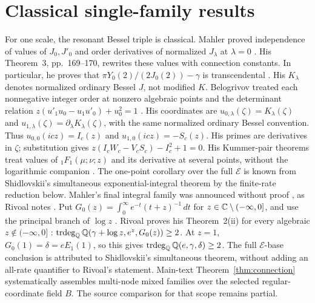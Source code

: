 \section{Classical single-family results}\label{sup:classical-comparison}
For one scale, the resonant Bessel triple is classical. Mahler proved
independence of values of $J_0,J'_0$ and order derivatives of normalized
$J_\lambda$ at $\lambda=0$ \cite[Theorem~2, p.~167]{Mahler1968}. His
Theorem~3, pp.~169--170, rewrites these values with connection constants.
In particular, he proves that $\pi Y_0(2)/(2J_0(2))-\gamma$ is
transcendental \cite[Theorem~3 and its consequence, pp.~169--170]{Mahler1968}.
His $K_\lambda$ denotes normalized ordinary Bessel $J$, not modified $K$.
Belogrivov treated each
nonnegative integer order at nonzero algebraic points and the determinant
relation $z(u'_1u_0-u_1u'_0)+u_0^2=1$
\cite[Theorem~4, Lemmas~4--5, (36)]{Belogrivov1973}.
His coordinates are $u_{0,\lambda}(\zeta)=K_\lambda(\zeta)$ and
$u_{1,\lambda}(\zeta)=\partial_\lambda K_\lambda(\zeta)$, with the
same normalized ordinary Bessel convention. Thus
$u_{0,0}(icz)=I_c(z)$ and $u_{1,0}(icz)=-S_c(z)$.
His primes are derivatives in $\zeta$; substitution gives
$z(I_cW_c-V_cS_c)-I_c^2+1=0$.
His Kummer-pair theorems treat values of ${}_1F_1(\mu;\nu;z)$ and its
derivative at several points, without the logarithmic companion
\cite[Theorems~1--2]{Belogrivov1971}.
The one-point corollary over the full $\mathcal E$ is known from
Shidlovskii's simultaneous exponential-integral theorem
\cite[Chapter~7, \S1, Theorem~1, pp.~232--233]{Shidlovskii1989}
by the finite-rate reduction below.
Mahler's final integral family was announced without proof
\cite[\S23, pp.~172--173]{Mahler1968}, as Rivoal notes
\cite[\S7]{Rivoal2012}.
Put $G_0(z)=\int_0^\infty e^{-t}(t+z)^{-1}\,dt$ for
$z\in\mathbb{C}\setminus(-\infty,0]$, and use the principal branch of $\log z$
\cite[p.~1 of the author manuscript]{Rivoal2012}.
Rivoal proves his Theorem~2(ii) for every algebraic
$z\notin(-\infty,0]$ \cite[Theorem~2(ii), \S\S5 and~7]{Rivoal2012}:
$\operatorname{trdeg}_{\mathbb{Q}}\mathbb{Q}(\gamma+\log z,e^z,G_0(z))\ge2$.
At $z=1$, $G_0(1)=\delta=eE_1(1)$, so this gives
$\operatorname{trdeg}_{\mathbb{Q}}\mathbb{Q}(e,\gamma,\delta)\ge2$.
The full $\mathcal E$-base conclusion is attributed to Shidlovskii's
simultaneous theorem, without adding an all-rate quantifier to Rivoal's statement.
Main-text Theorem~\ref{thm:connection} systematically assembles
multi-node mixed families over the selected regular-coordinate field $B$.
The source comparison for that scope remains partial.

